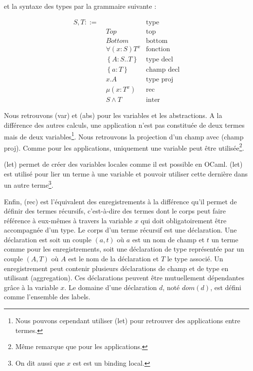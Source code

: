 et la syntaxe des types par la grammaire suivante :

\begin{align*}
  S, T ::= & \, & \text{type} \\
           & \; Top & \text{top} \\
           & \; Bottom & \text{bottom} \\
           & \; \forall(x : S) T^{x} & \text{fonction} \\
           & \; \left\{ A : S .. T \right\} & \text{type decl} \\
           & \; \left\{ a : T \right\} & \text{champ decl} \\
           & \; x.A & \text{type proj} \\
           & \; \mu(x : T^{x}) & \text{rec} \\
           & \; S \wedge T & \text{inter}
\end{align*}

Nous retrouvons (var) et (abs) pour les variables et les
abstractions.
A la différence des autres calculs, une application n'est pas constituée de deux
termes mais de deux variables\footnote{Nous pouvons cependant utiliser (let)
  pour retrouver des applications entre termes.}. Nous retrouvons la projection d'un champ avec
(champ proj). Comme pour les applications, uniquement une variable peut être
utilisée\footnote{Même remarque que pour les applications.}.

(let) permet de créer des variables locales comme il est possible en OCaml.
(let) est utilisé pour lier un terme à une variable et pouvoir utiliser cette
dernière dans un autre terme\footnote{On dit aussi que $x$ est est un binding local.}.

Enfin, (rec) est l'équivalent des enregistrements à la différence qu'il permet
de définir des termes récursifs, c'est-à-dire des termes
dont le corps peut faire référence à eux-mêmes à travers la variable $x$ qui
doit obligatoirement être accompagnée d'un type. Le
corps d'un terme récursif est une déclaration. Une déclaration est soit un
couple $(a, t)$ où $a$ est un nom de champ et $t$ un terme comme pour les
enregistrements, soit une déclaration de type représentée par un couple $(A,
T)$ où $A$ est le nom de la déclaration et $T$ le type associé. Un enregistrement peut contenir plusieurs déclarations de champ et
de type en utilisant (aggregation). Ces déclarations peuvent être mutuellement
dépendantes grâce à la variable $x$.
Le domaine d'une déclaration $d$, noté $dom(d)$, est défini comme l'ensemble des
labels.

